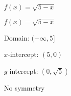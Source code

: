 {$f(x) = \sqrt{5 - x}$}
{$f(x) = \sqrt{5 - x}$ 

Domain: $(-\infty, 5]$ 

$x$-intercept: $(5, 0)$ 

$y$-intercept: $(0, \sqrt{5})$ 

No symmetry 

\begin{center}
\end{center}
}
